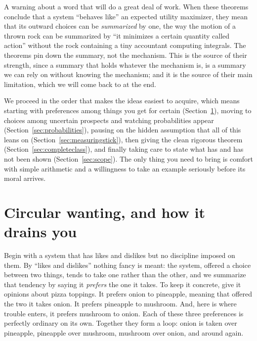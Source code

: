 \documentclass[10pt]{article}
\theoremstyle{definition}
\theoremstyle{remark}
\begin{document}
A warning about a word that will do a great deal of work. When these theorems conclude that a system ``behaves like'' an expected utility maximizer, they mean that its outward choices can be \emph{summarized} by one, the way the motion of a thrown rock can be summarized by ``it minimizes a certain quantity called action'' without the rock containing a tiny accountant computing integrals. The theorems pin down the summary, not the mechanism. This is the source of their strength, since a summary that holds whatever the mechanism is, is a summary we can rely on without knowing the mechanism; and it is the source of their main limitation, which we will come back to at the end.

We proceed in the order that makes the ideas easiest to acquire, which means starting with preferences among things you get for certain (Section~\ref{sec:moneypump}), moving to choices among uncertain prospects and watching probabilities appear (Section~\ref{sec:probabilities}), pausing on the hidden assumption that all of this leans on (Section~\ref{sec:measuringstick}), then giving the clean rigorous theorem (Section~\ref{sec:completeclass}), and finally taking care to state what has and has not been shown (Section~\ref{sec:scope}). The only thing you need to bring is comfort with simple arithmetic and a willingness to take an example seriously before its moral arrives.

\section{Circular wanting, and how it drains you}
\label{sec:moneypump}

Begin with a system that has likes and dislikes but no discipline imposed on them. By ``likes and dislikes'' nothing fancy is meant: the system, offered a choice between two things, tends to take one rather than the other, and we summarize that tendency by saying it \emph{prefers} the one it takes. To keep it concrete, give it opinions about pizza toppings. It prefers onion to pineapple, meaning that offered the two it takes onion. It prefers pineapple to mushroom. And, here is where trouble enters, it prefers mushroom to onion. Each of these three preferences is perfectly ordinary on its own. Together they form a loop: onion is taken over pineapple, pineapple over mushroom, mushroom over onion, and around again.
\end{document}
